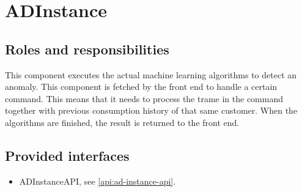 \section{ADInstance}
\label{element:ad-instance}

\subsection{Roles and responsibilities}

\npar This component executes the actual machine learning algorithms to detect
an anomaly. This component is fetched by the front end to handle a certain
command. This means that it needs to process the trame in the command together
with previous consumption history of that same customer. When the algorithms are
finished, the result is returned to the front end.

\subsection{Provided interfaces}

\begin{itemize}
  \item ADInstanceAPI, see \ref{api:ad-instance-api}.
\end{itemize}



